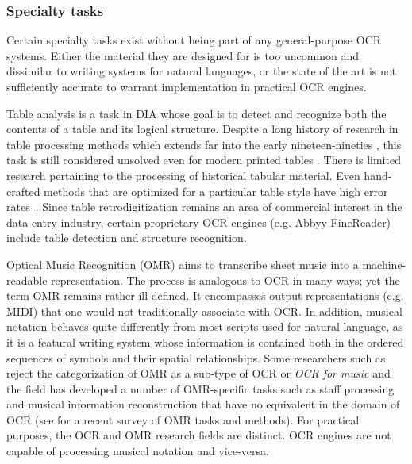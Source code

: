 \subsubsection{Specialty tasks}

Certain specialty tasks exist without being part of any general-purpose OCR
systems. Either the material they are designed for is too uncommon and
dissimilar to writing systems for natural languages, or the state of the art is
not sufficiently accurate to warrant implementation in practical OCR engines.

Table analysis is a task in DIA whose goal is to detect and recognize both the
contents of a table and its logical structure. Despite a long history of
research in table processing methods which extends far into the early
nineteen-nineties \cite{zanibbi2004survey}, this task is still considered
unsolved even for modern printed tables \cite{gao2019icdar}. There is limited
research pertaining to the processing of historical tabular material. Even
hand-crafted methods that are optimized for a particular table style have high
error rates~\cite{lehenmeier2020layout}. Since table retrodigitization remains
an area of commercial interest in the data entry industry, certain proprietary
OCR engines (e.g. Abbyy FineReader) include table detection and structure
recognition.

Optical Music Recognition (OMR) aims to transcribe sheet music into a
ma\-chine-readable representation. The process is analogous to OCR in many ways;
yet the term OMR remains rather ill-defined. It encompasses output
representations (e.g. MIDI) that one would not traditionally associate with
OCR. In addition, musical notation behaves quite differently from most scripts
used for natural language, as it is a featural writing system whose information
is contained both in the ordered sequences of symbols and their spatial
relationships. Some researchers such as \cite{calvo2020understanding} reject
the categorization of OMR as a sub-type of OCR or \emph{OCR for music} and the
field has developed a number of OMR-specific tasks such as staff processing and
musical information reconstruction that have no equivalent in the domain of OCR
(see \cite{shatri2020optical} for a recent survey of OMR tasks and methods).
For practical purposes, the OCR and OMR research fields are distinct. OCR
engines are not capable of processing musical notation and vice-versa.

